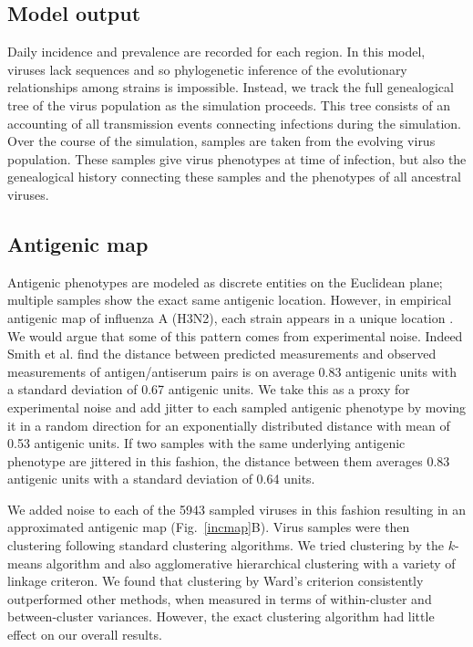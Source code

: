 \documentclass[11pt,oneside,letterpaper]{article}
\begin{document}
\subsection*{Model output}

Daily incidence and prevalence are recorded for each region.  In this model, viruses lack sequences and so phylogenetic inference of the evolutionary relationships among strains is impossible.  Instead, we track the full genealogical tree of the virus population as the simulation proceeds.  This tree consists of an accounting of all transmission events connecting infections during the simulation.  Over the course of the simulation, samples are taken from the evolving virus population.  These samples give virus phenotypes at time of infection, but also the genealogical history connecting these samples and the phenotypes of all ancestral viruses.

\subsection*{Antigenic map}

Antigenic phenotypes are modeled as discrete entities on the Euclidean plane; multiple samples show the exact same antigenic location.  However, in empirical antigenic map of influenza A (H3N2), each strain appears in a unique location \cite{Smith04}.  We would argue that some of this pattern comes from experimental noise.  Indeed Smith et al. \cite{Smith04} find the distance between predicted measurements and observed measurements of antigen/antiserum pairs is on average 0.83 antigenic units with a standard deviation of 0.67 antigenic units.  We take this as a proxy for experimental noise and add jitter to each sampled antigenic phenotype by moving it in a random direction for an exponentially distributed distance with mean of 0.53 antigenic units.  If two samples with the same underlying antigenic phenotype are jittered in this fashion, the distance between them averages 0.83 antigenic units with a standard deviation of 0.64 units.

We added noise to each of the 5943 sampled viruses in this fashion resulting in an approximated antigenic map (Fig.~\ref{incmap}B).  Virus samples were then clustering following standard clustering algorithms.  We tried clustering by the $k$-means algorithm and also agglomerative hierarchical clustering with a variety of linkage criteron.  We found that clustering by Ward's criterion consistently outperformed other methods, when measured in terms of within-cluster and between-cluster variances.  However, the exact clustering algorithm had little effect on our overall results.
\end{document}
